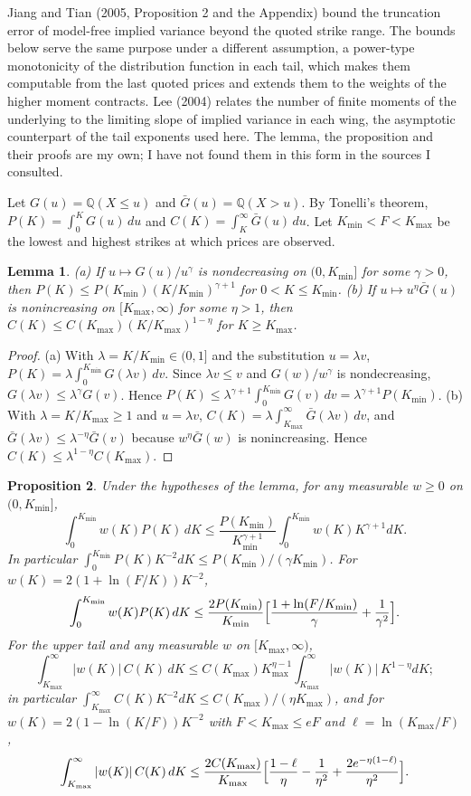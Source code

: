 \documentclass[11pt]{article}
\newtheorem{proposition}{Proposition}
\newtheorem{lemma}[proposition]{Lemma}
\theoremstyle{remark}
\newcommand{\Q}{\mathbb{Q}}
\begin{document}
Jiang and Tian (2005, Proposition 2 and the Appendix) bound the truncation error of model-free implied variance beyond the quoted strike range. The bounds below serve the same purpose under a different assumption, a power-type monotonicity of the distribution function in each tail, which makes them computable from the last quoted prices and extends them to the weights of the higher moment contracts. Lee (2004) relates the number of finite moments of the underlying to the limiting slope of implied variance in each wing, the asymptotic counterpart of the tail exponents used here. The lemma, the proposition and their proofs are my own; I have not found them in this form in the sources I consulted.

Let $G(u)=\Q(X\le u)$ and $\bar G(u)=\Q(X>u)$. By Tonelli's theorem, $P(K)=\int_0^K G(u)\,du$ and $C(K)=\int_K^\infty\bar G(u)\,du$. Let $K_{\min}<F<K_{\max}$ be the lowest and highest strikes at which prices are observed.

\begin{lemma}
(a) If $u\mapsto G(u)/u^\gamma$ is nondecreasing on $(0,K_{\min}]$ for some $\gamma>0$, then $P(K)\le P(K_{\min})(K/K_{\min})^{\gamma+1}$ for $0<K\le K_{\min}$. (b) If $u\mapsto u^\eta\bar G(u)$ is nonincreasing on $[K_{\max},\infty)$ for some $\eta>1$, then $C(K)\le C(K_{\max})(K/K_{\max})^{1-\eta}$ for $K\ge K_{\max}$.
\end{lemma}

\begin{proof}
(a) With $\lambda=K/K_{\min}\in(0,1]$ and the substitution $u=\lambda v$, $P(K)=\lambda\int_0^{K_{\min}}G(\lambda v)\,dv$. Since $\lambda v\le v$ and $G(w)/w^\gamma$ is nondecreasing, $G(\lambda v)\le\lambda^\gamma G(v)$. Hence $P(K)\le\lambda^{\gamma+1}\int_0^{K_{\min}}G(v)\,dv=\lambda^{\gamma+1}P(K_{\min})$. (b) With $\lambda=K/K_{\max}\ge1$ and $u=\lambda v$, $C(K)=\lambda\int_{K_{\max}}^\infty\bar G(\lambda v)\,dv$, and $\bar G(\lambda v)\le\lambda^{-\eta}\bar G(v)$ because $w^\eta\bar G(w)$ is nonincreasing. Hence $C(K)\le\lambda^{1-\eta}C(K_{\max})$.
\end{proof}

\begin{proposition}
Under the hypotheses of the lemma, for any measurable $w\ge0$ on $(0,K_{\min}]$,
\[
\int_0^{K_{\min}}w(K)P(K)\,dK\le\frac{P(K_{\min})}{K_{\min}^{\gamma+1}}\int_0^{K_{\min}}w(K)K^{\gamma+1}dK.
\]
In particular $\int_0^{K_{\min}}P(K)K^{-2}dK\le P(K_{\min})/(\gamma K_{\min})$. For $w(K)=2(1+\ln(F/K))K^{-2}$,
\[
\int_0^{K_{\min}}w(K)P(K)\,dK\le\frac{2P(K_{\min})}{K_{\min}}\Bigl[\frac{1+\ln(F/K_{\min})}{\gamma}+\frac{1}{\gamma^2}\Bigr].
\]
For the upper tail and any measurable $w$ on $[K_{\max},\infty)$,
\[
\int_{K_{\max}}^\infty|w(K)|\,C(K)\,dK\le C(K_{\max})K_{\max}^{\eta-1}\int_{K_{\max}}^\infty|w(K)|\,K^{1-\eta}dK;
\]
in particular $\int_{K_{\max}}^\infty C(K)K^{-2}dK\le C(K_{\max})/(\eta K_{\max})$, and for $w(K)=2(1-\ln(K/F))K^{-2}$ with $F<K_{\max}\le eF$ and $\ell=\ln(K_{\max}/F)$,
\[
\int_{K_{\max}}^\infty|w(K)|\,C(K)\,dK\le\frac{2C(K_{\max})}{K_{\max}}\Bigl[\frac{1-\ell}{\eta}-\frac{1}{\eta^2}+\frac{2e^{-\eta(1-\ell)}}{\eta^2}\Bigr].
\]
\end{proposition}
\end{document}
